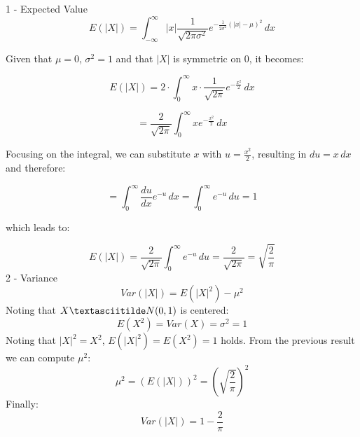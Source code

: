 \documentclass{article}
\begin{document}
1 - Expected Value
\[
E(|X|) = \int_{-\infty}^{\infty} |x| \frac{1}{\sqrt{2 \pi \sigma^2}} e^{-\frac{1}{2 \sigma^2} (|x| - \mu)^2} \, dx
\]

Given that \( \mu = 0 \), \( \sigma^2 = 1 \) and that \( |X| \) is symmetric on \( 0 \), it becomes:

\[
E(|X|) = 2 \cdot \int_{0}^{\infty} x \cdot \frac{1}{\sqrt{2 \pi}} e^{-\frac{x^2}{2}} \, dx
\]

\[
= \frac{2}{\sqrt{2 \pi}} \int_{0}^{\infty} x e^{-\frac{x^2}{2}} \, dx
\]

Focusing on the integral, we can substitute \(x\) with \( u = \frac{x^2}{2} \), resulting in \(du = x\, dx\) and therefore:

\[
= \int_{0}^{\infty} \frac{du}{dx} e^{-u} \, dx = \int_{0}^{\infty} e^{-u} \, du = 1
\]

which leads to:

\[
E(|X|) = \frac{2}{\sqrt{2 \pi}} \int_{0}^{\infty} e^{-u} \, du = \frac{2}{\sqrt{2 \pi}} = \sqrt{\frac{2}{\pi}} 
\]  
2 - Variance
\[
Var(|X|) = E(|X|^2) - \mu^2
\]
Noting that \(X\textasciitilde N(0,1)\) is centered: 
\[
E(X^2)=Var(X)=\sigma^2=1
\]
Noting that \(|X|^2=X^2\), \(E(|X|^2)=E(X^2)=1\) holds.
From the previous result we can compute \(\mu^2\):
\[
\mu^2 = (E(|X|))^2 =(\sqrt{\frac{2}{\pi}})^2
\]
Finally:
\[
Var(|X|)=1-\frac{2}{\pi}
\]
\end{document}
